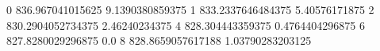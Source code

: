 0 836.967041015625 9.1390380859375
1 833.2337646484375 5.40576171875
2 830.2904052734375 2.46240234375
4 828.304443359375 0.4764404296875
6 827.8280029296875 0.0
8 828.8659057617188 1.03790283203125
